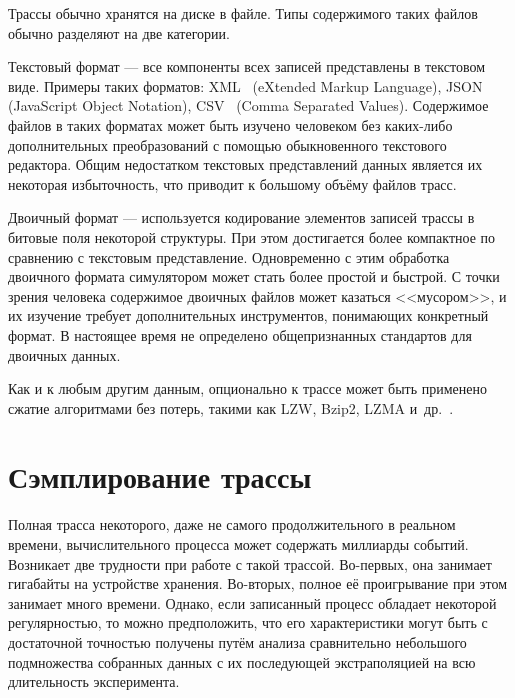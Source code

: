Трассы обычно хранятся на диске в файле. Типы содержимого таких файлов обычно разделяют на две категории.

\begin{description*}
    \item[Текстовый формат] --- все компоненты всех записей представлены в текстовом виде. Примеры таких форматов: XML~\cite{xml-std} (\abbr eXtended Markup Language), JSON~\cite{json-std} (\abbr  JavaScript Object Notation), CSV~\cite{csv-rfc} (\abbr Comma Separated Values). Содержимое файлов в таких форматах может быть изучено человеком без каких-либо дополнительных преобразований с помощью обыкновенного текстового редактора. Общим недостатком текстовых представлений данных является их некоторая избыточность, что приводит к большому объёму файлов трасс. 
    
    \item[Двоичный формат] --- используется кодирование элементов записей трассы в битовые поля некоторой структуры. При этом достигается более компактное по сравнению с текстовым представление. Одновременно с этим обработка двоичного формата симулятором может стать более простой и быстрой. С точки зрения человека содержимое двоичных файлов может казаться <<мусором>>, и их изучение требует дополнительных инструментов, понимающих конкретный формат. В настоящее время не определено общепризнанных стандартов для двоичных данных.
\end{description*}

Как и к любым другим данным, опционально к трассе может быть применено сжатие алгоритмами без потерь, такими как LZW, Bzip2, LZMA и~др.~\cite{sayood2002lossless}.

\section{Сэмплирование трассы}

Полная трасса некоторого, даже не самого продолжительного в реальном времени, вычислительного процесса может содержать миллиарды событий. Возникает две трудности при работе с такой трассой. Во-первых, она занимает гигабайты на устройстве хранения. Во-вторых, полное её проигрывание при этом занимает много времени. Однако, если записанный процесс обладает некоторой регулярностью, то можно предположить, что его характеристики могут быть с достаточной точностью получены путём анализа сравнительно небольшого подмножества собранных данных с их последующей экстраполяцией на всю длительность эксперимента.

